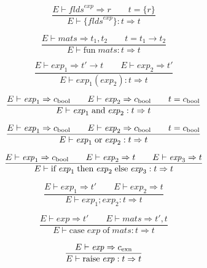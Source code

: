 \documentclass[twoside]{article}
\newcommand{\x}[1]{\mathit{#1}}
\newcommand{\f}[1]{\mbox{#1}}
\renewcommand{\c}[1]{c_{\f{\scriptsize #1}}}
\renewcommand{\exp}{\x{exp}}
\newcommand{\flds}{\x{flds}}
\newcommand{\mats}{\x{mats}}
\begin{document}
\begin{equation}
\frac{
E \vdash \flds^\exp \Rightarrow r
\qquad
t = \{r\}
}{
E \vdash \{\flds^\exp\} : t \Rightarrow t
}
\end{equation}

\begin{equation}
\frac{
E \vdash \mats \Rightarrow t_1,t_2
\qquad
t = t_1 \to t_2
}{
E \vdash \f{fun}\;\mats : t \Rightarrow t
}
\end{equation}

\begin{equation}
\frac{
E \vdash \exp_1 \Rightarrow t' \to t
\qquad
E \vdash \exp_2 \Rightarrow t'
}{
E \vdash \exp_1(\exp_2) : t \Rightarrow t
}
\end{equation}

\begin{equation}
\frac{
E \vdash \exp_1 \Rightarrow \c{bool}
\qquad
E \vdash \exp_2 \Rightarrow \c{bool}
\qquad
t = \c{bool}
}{
E \vdash \exp_1\;\f{and}\;\exp_2 : t \Rightarrow t
}
\end{equation}

\begin{equation}
\frac{
E \vdash \exp_1 \Rightarrow \c{bool}
\qquad
E \vdash \exp_2 \Rightarrow \c{bool}
\qquad
t = \c{bool}
}{
E \vdash \exp_1\;\f{or}\;\exp_2 : t \Rightarrow t
}
\end{equation}

\begin{equation}
\frac{
E \vdash \exp_1 \Rightarrow \c{bool}
\qquad
E \vdash \exp_2 \Rightarrow t
\qquad
E \vdash \exp_3 \Rightarrow t
}{
E \vdash \f{if}\;\exp_1\;\f{then}\;\exp_2\;\f{else}\;\exp_3 : t \Rightarrow t
}
\end{equation}

\begin{equation}
\frac{
E \vdash \exp_1 \Rightarrow t'
\qquad
E \vdash \exp_2 \Rightarrow t
}{
E \vdash \exp_1;\exp_2 : t \Rightarrow t
}
\end{equation}

\begin{equation}
\frac{
E \vdash \exp \Rightarrow t'
\qquad
E \vdash \mats \Rightarrow t',t
}{
E \vdash \f{case}\;\exp\;\f{of}\;\mats : t \Rightarrow t
}
\end{equation}

\begin{equation}
\frac{
E \vdash \exp \Rightarrow \c{exn}
}{
E \vdash \f{raise}\;\exp : t \Rightarrow t
}
\end{equation}
\end{document}
